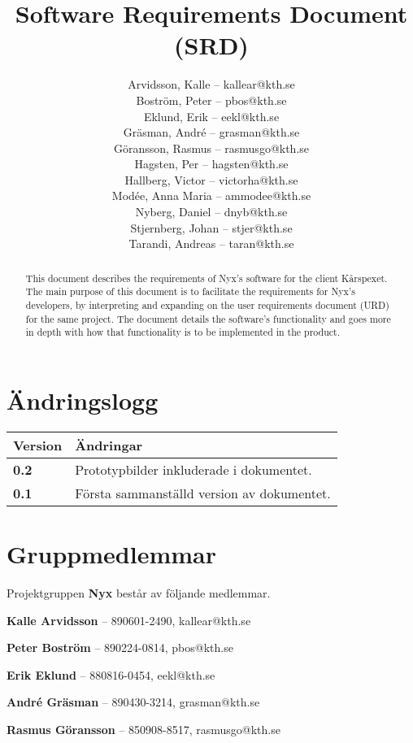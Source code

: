 \documentclass[a4paper, twoside, 11pt, titlepage]{article}
\author{
	\small
	Arvidsson, Kalle -- kallear@kth.se\\
	Boström, Peter -- pbos@kth.se\\
	Eklund, Erik -- eekl@kth.se\\
	Gräsman, André -- grasman@kth.se\\
	Göransson, Rasmus -- rasmusgo@kth.se\\
	Hagsten, Per -- hagsten@kth.se\\
	Hallberg, Victor -- victorha@kth.se\\
	Modée, Anna Maria -- ammodee@kth.se\\
	Nyberg, Daniel -- dnyb@kth.se\\
	Stjernberg, Johan -- stjer@kth.se\\
	Tarandi, Andreas -- taran@kth.se
	}
\title{Software Requirements Document (SRD)}
\begin{document}
\maketitle

\clearpage
\thispagestyle{empty}
\mbox{}
\newpage

\begin{abstract}
	This document describes the requirements of Nyx's software for the client Kårspexet. The main purpose of this document is to facilitate the requirements for Nyx's developers, by interpreting and expanding on the user requirements document (URD) for the same project. The document details the software's functionality and goes more in depth with how that functionality is to be implemented in the product.
\end{abstract}

\newpage

\setcounter{page}{1}

\startfooter

\clearpage
\section*{Ändringslogg}


\begin{tabular} { p{2.6cm} p{12.5cm} }
	\hline
	\sffamily\textbf{Version} & \sffamily\textbf{Ändringar } \\
	\hline
	\sffamily\textbf{0.2} & Prototypbilder inkluderade i dokumentet.  \\
	\hline
	\sffamily\textbf{0.1} & Första sammanställd version av dokumentet.  \\
	\hline
\end{tabular}


\clearpage
\section*{Gruppmedlemmar}


Projektgruppen \textbf{Nyx} består av följande medlemmar.

\textbf{Kalle Arvidsson} -- 890601-2490, kallear@kth.se

\textbf{Peter Boström} -- 890224-0814, pbos@kth.se

\textbf{Erik Eklund} -- 880816-0454, eekl@kth.se 

\textbf{André Gräsman} -- 890430-3214, grasman@kth.se 

\textbf{Rasmus Göransson} -- 850908-8517, rasmusgo@kth.se 
\end{document}
